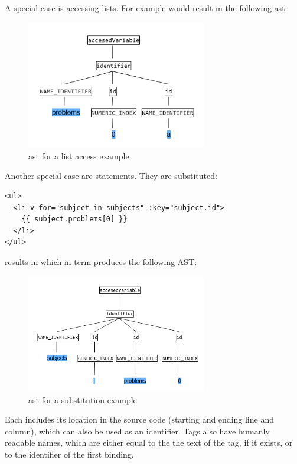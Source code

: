 A special case is accessing lists. For example  would result in the following \gls{ast}:

\begin{figure}[H]
    \centering
    \includegraphics[width=0.7\textwidth]{images/ast_problems_0_a.png}
     \caption{\gls{ast} for a list access example }
     \label{fig:ast_list_simple}
\end{figure}
Another special case are  statements. They are substituted:
\begin{lstlisting}[style=html]
<ul>
  <li v-for="subject in subjects" :key="subject.id">
    {{ subject.problems[0] }}
  </li>
</ul>
\end{lstlisting}
results in  which in term produces the following AST:

\begin{figure}[H]
    \centering
    \includegraphics[width=0.7\textwidth]{images/ast_numeric_generic.png}
     \caption{\gls{ast} for a  substitution example }
     \label{fig:ast_list_complex}
\end{figure}

Each  includes its location in the source code (starting and ending line and column), which can also be used as an identifier. Tags also have humanly readable names, which are either equal to the the text of the tag, if it exists, or to the identifier of the first binding. 


